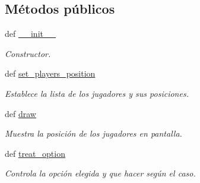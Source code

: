 \subsection*{\-Métodos públicos}
\begin{DoxyCompactItemize}
\item 
def \hyperlink{classengine_1_1classificationmenu_1_1ClassificationMenu_ac472dd85391a4c770f6d2d14e1da6db0}{\-\_\-\-\_\-init\-\_\-\-\_\-}
\begin{DoxyCompactList}\small\item\em \-Constructor. \end{DoxyCompactList}\item 
def \hyperlink{classengine_1_1classificationmenu_1_1ClassificationMenu_ae23552e8659e8f81a366047544d84157}{set\-\_\-players\-\_\-position}
\begin{DoxyCompactList}\small\item\em \-Establece la lista de los jugadores y sus posiciones. \end{DoxyCompactList}\item 
def \hyperlink{classengine_1_1classificationmenu_1_1ClassificationMenu_ac3c291e0806bc66a646c4261899514a4}{draw}
\begin{DoxyCompactList}\small\item\em \-Muestra la posición de los jugadores en pantalla. \end{DoxyCompactList}\item 
\hypertarget{classengine_1_1classificationmenu_1_1ClassificationMenu_a4bd98c00e75838ed9a5fe1c08bd7fc91}{
def \hyperlink{classengine_1_1classificationmenu_1_1ClassificationMenu_a4bd98c00e75838ed9a5fe1c08bd7fc91}{treat\-\_\-option}}
\label{classengine_1_1classificationmenu_1_1ClassificationMenu_a4bd98c00e75838ed9a5fe1c08bd7fc91}

\begin{DoxyCompactList}\small\item\em \-Controla la opción elegida y que hacer según el caso. \end{DoxyCompactList}\end{DoxyCompactItemize}
